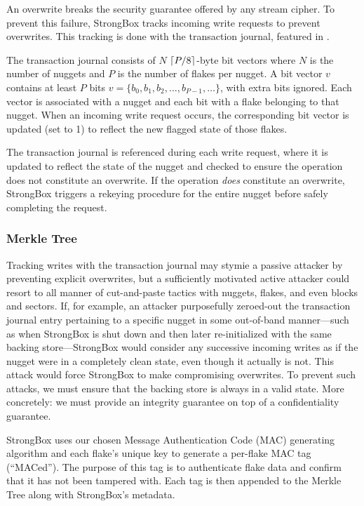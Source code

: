 An overwrite breaks the security guarantee offered by any stream
cipher. To prevent this failure, StrongBox tracks incoming write
requests to prevent overwrites. This tracking is done with the
transaction journal, featured in .

The transaction journal consists of $N$ $\lceil P / 8 \rceil$-byte bit
vectors where $N$ is the number of nuggets and $P$ is the number of
flakes per nugget. A bit vector $v$ contains at least $P$ bits $v = \{
b_0, b_1, b_2, \dots, b_{P-1}, \dots \}$, with extra bits ignored.
Each vector is associated with a nugget and each bit with a flake
belonging to that nugget. When an incoming write request occurs, the
corresponding bit vector is updated (set to 1) to reflect the new
flagged state of those flakes.

The transaction journal is referenced during each write request, where
it is updated to reflect the state of the nugget and checked to ensure
the operation does not constitute an overwrite. If the operation
\textit{does} constitute an overwrite, StrongBox triggers a rekeying
procedure for the entire nugget before safely completing the request.

\subsubsection{Merkle Tree}\label{sec:merkle}

Tracking writes with the transaction journal may stymie a passive
attacker by preventing explicit overwrites, but a sufficiently
motivated active attacker could resort to all manner of cut-and-paste
tactics with nuggets, flakes, and even blocks and sectors. If, for
example, an attacker purposefully zeroed-out the transaction journal
entry pertaining to a specific nugget in some out-of-band
manner---such as when StrongBox is shut down and then later
re-initialized with the same backing store---StrongBox would consider
any successive incoming writes as if the nugget were in a completely
clean state, even though it actually is not. This attack would force
StrongBox to make compromising overwrites. To prevent such attacks, we
must ensure that the backing store is always in a valid state. More
concretely: we must provide an integrity guarantee on top of a
confidentiality guarantee.

StrongBox uses our chosen Message Authentication Code (MAC) generating algorithm
and each flake's unique key to generate a per-flake MAC tag (``MACed''). The
purpose of this tag is to authenticate flake data and confirm that it has not
been tampered with. Each tag is then appended to the Merkle Tree along with
StrongBox's metadata.

